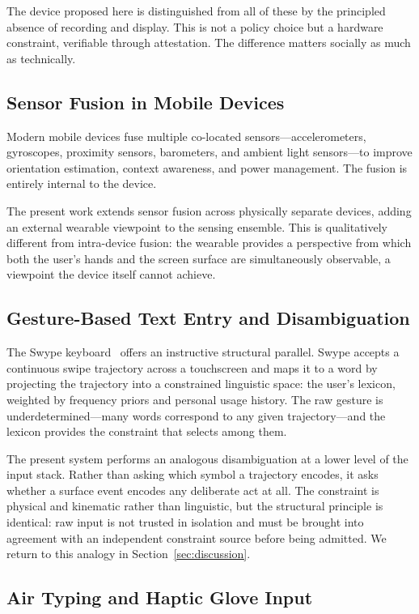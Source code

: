 \documentclass[11pt,letterpaper]{article}
\begin{document}
The device proposed here is distinguished from all of these by the principled
absence of recording and display. This is not a policy choice but a hardware
constraint, verifiable through attestation. The difference matters socially as much
as technically.

\subsection{Sensor Fusion in Mobile Devices}

Modern mobile devices fuse multiple co-located sensors---accelerometers, gyroscopes,
proximity sensors, barometers, and ambient light sensors---to improve orientation
estimation, context awareness, and power management. The fusion is entirely internal
to the device.

The present work extends sensor fusion across physically separate devices, adding an
external wearable viewpoint to the sensing ensemble. This is qualitatively different
from intra-device fusion: the wearable provides a perspective from which both the
user's hands and the screen surface are simultaneously observable, a viewpoint the
device itself cannot achieve.

\subsection{Gesture-Based Text Entry and Disambiguation}

The Swype keyboard~\cite{swype} offers an instructive structural parallel. Swype
accepts a continuous swipe trajectory across a touchscreen and maps it to a word by
projecting the trajectory into a constrained linguistic space: the user's lexicon,
weighted by frequency priors and personal usage history. The raw gesture is
underdetermined---many words correspond to any given trajectory---and the lexicon
provides the constraint that selects among them.

The present system performs an analogous disambiguation at a lower level of the
input stack. Rather than asking which symbol a trajectory encodes, it asks whether
a surface event encodes any deliberate act at all. The constraint is physical and
kinematic rather than linguistic, but the structural principle is identical: raw
input is not trusted in isolation and must be brought into agreement with an
independent constraint source before being admitted. We return to this analogy in
Section~\ref{sec:discussion}.

\subsection{Air Typing and Haptic Glove Input}
\end{document}
